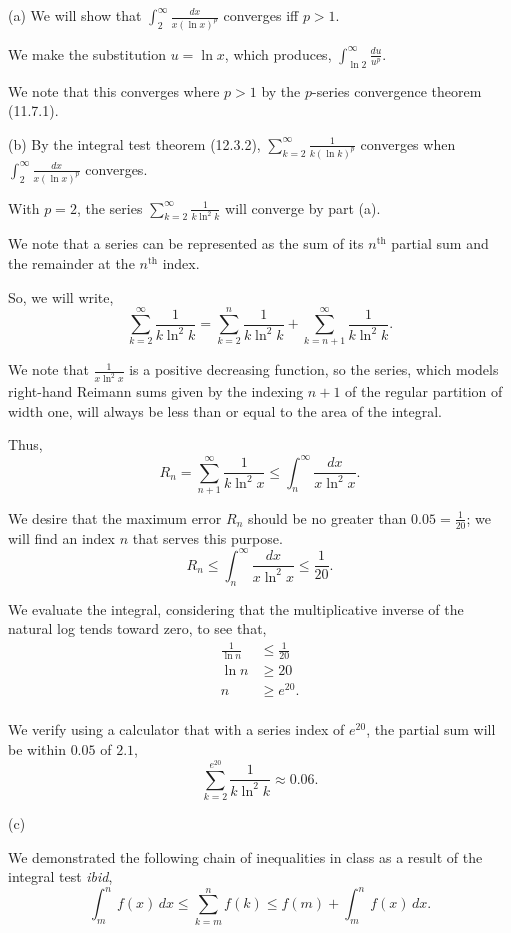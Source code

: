 \documentclass[../root file]{subfiles}
\begin{document}
(a) We will show that $\int_{2}^{\infty}\frac{dx}{x{(\ln{x})}^p}$ converges iff $p>1$.

We make the substitution $u=\ln{x}$, which produces, $\int_{\ln{2}}^{\infty}\frac{du}{u^p}$.

We note that this converges where $p>1$ by the $p$-series convergence theorem (11.7.1).

(b) By the integral test theorem (12.3.2), $\sum_{k=2}^{\infty} \frac{1}{k{(\ln{k})}^p}$ converges when $\int_{2}^{\infty} \frac{dx}{x{(\ln{x})}^p}$ converges. 

With $p=2$, the series $\sum_{k=2}^{\infty} \frac{1}{k\ln^2{k}}$ will converge by part (a).

We note that a series can be represented as the sum of its $n^{\text{th}}$ partial sum and the remainder at the $n^{\text{th}}$ index.

So, we will write, \[\sum_{k=2}^{\infty} \frac{1}{k\ln^2{k}} = \sum_{k=2}^{n} \frac{1}{k\ln^2{k}} + \sum_{k=n+1}^{\infty} \frac{1}{k\ln^2{k}}.\]
 
We note that $\frac{1}{x\ln^2{x}}$ is a positive decreasing function, so the series, which models right-hand Reimann sums given by the indexing $n+1$ of the regular partition of width one, will always be less than or equal to the area of the integral.

Thus, \[R_n=\sum_{n+1}^{\infty}\frac{1}{k\ln^2{x}} \leq \int_{n}^{\infty} \frac{dx}{x\ln^2{x}}.\]

We desire that the maximum error $R_n$ should be no greater than $0.05=\frac{1}{20}$; we will find an index $n$ that serves this purpose.
\[R_n \leq \int_{n}^{\infty} \frac{dx}{x\ln^2{x}} \leq \frac{1}{20}.\]

We evaluate the integral, considering that the multiplicative inverse of the natural log tends toward zero, to see that,
\begin{align*}
    \frac{1}{\ln{n}}&\leq\frac{1}{20} \\
    \ln{n}&\geq 20 \\
    n&\geq e^{20}. \\
\end{align*}

We verify using a calculator that with a series index of $e^{20}$, the partial sum will be within $0.05$ of $2.1$,
\[\sum_{k=2}^{e^{20}}\frac{1}{k\ln^2{k}}\approx0.06.\]

(c)

We demonstrated the following chain of inequalities in class as a result of the integral test \textit{ibid}, 
\[\int_{m}^{n}f(x)\,dx\leq\sum_{k=m}^{n}f(k)\leq f(m)+\int_{m}^{n}f(x)\,dx.\]
\end{document}
